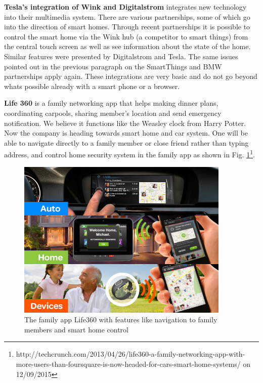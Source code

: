 \textbf{Tesla's integration of Wink and Digitalstrom} integrates new technology into their multimedia system. There are various partnerships, some of which go into the direction of smart homes. Through recent partnerships it is possible to control the smart home via the Wink hub (a competitor to smart things) from the central touch screen as well as see information about the state of the home. Similar features were presented by Digitalstrom and Tesla. The same issues pointed out in the previous paragraph on the SmartThings and BMW partnerships apply again. These integrations are very basic and do not go beyond whats possible already with a smart phone or a browser.

\textbf{Life 360} is a family networking app that helps making dinner plans, coordinating carpools, sharing member's location and send emergency notification. We believe it functions like the Weasley clock from Harry Potter. Now the company is heading towards smart home and car system. One will be able to navigate directly to a family member or close friend rather than typing address, and control home security system in the family app as shown in Fig. \ref{fig.Life360}\footnote{http://techcrunch.com/2013/04/26/life360-a-family-networking-app-with-more-users-than-foursquare-is-now-headed-for-cars-smart-home-systems/ on 12/09/2015}. 

\begin{figure}
\centering
	\includegraphics[keepaspectratio, width=4in]{Figures/BenchmarkingOld/Life360.png}
	\caption{The family app Life360 with features like navigation to family members and smart home control}
    \label{fig.Life360}
\end{figure}

